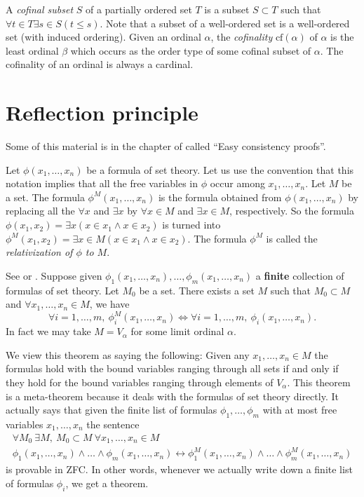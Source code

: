 \noindent
A {\it cofinal subset} $S$ of a partially ordered set $T$ is a subset
$S \subset T$ such that $\forall t \in T \exists s\in S (t \leq s)$.
Note that a subset of a well-ordered set is a well-ordered set
(with induced ordering). Given an ordinal $\alpha$, the {\it cofinality}
$\text{cf}(\alpha)$ of $\alpha$ is the least ordinal $\beta$
which occurs as the order type of some cofinal subset of $\alpha$.
The cofinality of an ordinal is always a cardinal.

\section{Reflection principle}
\label{section-reflection-principle}

\noindent
Some of this material is in the chapter of \cite{Kunen} called
``Easy consistency proofs''.

\medskip\noindent
Let $\phi(x_1, \ldots, x_n)$ be a formula of set theory.
Let us use the convention that this notation implies that
all the free variables in $\phi$ occur among $x_1, \ldots, x_n$.
Let $M$ be a set.
The formula $\phi^M(x_1, \ldots, x_n)$ is the
formula obtained from $\phi(x_1, \ldots, x_n)$ by replacing all the
$\forall x$ and $\exists x$ by $\forall x\in M$ and $\exists x\in M$,
respectively. So the formula
$\phi(x_1, x_2) = \exists x (x\in x_1 \wedge x\in x_2)$
is turned  into
$\phi^M(x_1, x_2) = \exists x \in M (x\in x_1 \wedge x\in x_2)$.
The formula $\phi^M$ is called the {\it relativization of $\phi$
to $M$}.

\begin{theorem}
\label{theorem-reflection-principle}
See \cite[Theorem 12.14]{Jech} or \cite[Theorem 7.4]{Kunen}.
Suppose given $\phi_1(x_1, \ldots, x_n), \ldots, \phi_m(x_1, \ldots, x_n)$
a {\bf finite} collection of
formulas of set theory. Let $M_0$ be a set.
There exists a set $M$ such that
$M_0 \subset M$ and
$\forall x_1, \ldots, x_n \in M$, we have
$$
\forall i = 1, \ldots, m, \ 
\phi_i^{M}(x_1, \ldots, x_n)
\Leftrightarrow
\forall i = 1, \ldots, m, \ 
\phi_i(x_1, \ldots, x_n).
$$
In fact we may take $M = V_\alpha$ for some limit ordinal $\alpha$.
\end{theorem}

\noindent
We view this theorem as saying the following: Given any
$x_1, \ldots, x_n \in M$ the formulas hold with the bound variables ranging
through all sets if and only if they hold for the bound variables ranging
through elements of $V_\alpha$. This theorem is a meta-theorem because 
it deals with the formulas of set theory directly.
It actually says that given the finite list of formulas
$\phi_1, \ldots, \phi_m$ with at most free variables $x_1, \ldots, x_n$
the sentence
$$
\begin{matrix}
\forall M_0\ \exists M, \ M_0 \subset M\ \forall x_1, \ldots, x_n \in M \\
\phi_1(x_1, \ldots, x_n) \wedge \ldots \wedge \phi_m(x_1, \ldots, x_n)
\leftrightarrow
\phi_1^M(x_1, \ldots, x_n) \wedge \ldots \wedge \phi_m^M(x_1, \ldots, x_n)
\end{matrix}
$$
is provable in ZFC. In other words, whenever we actually write down
a finite list of formulas $\phi_i$, we get a theorem.


